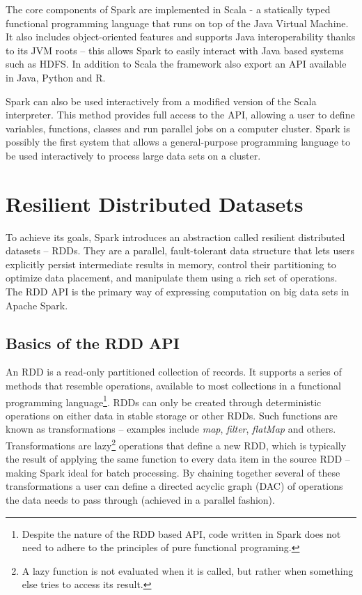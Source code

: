 \documentclass{l4proj}
\begin{document}
The core components of Spark are implemented in Scala - a statically typed functional programming language that runs on top of the Java Virtual Machine. It also includes object-oriented features and supports Java interoperability thanks to its JVM roots -- this allows Spark to easily interact with Java based systems such as HDFS. In addition to Scala the framework also export an API available in Java, Python and R.

Spark can also be used interactively from a modified version of the Scala interpreter. This method provides full access to the API, allowing a user to define variables, functions, classes and run parallel jobs on a computer cluster. Spark is possibly the first system that allows a general-purpose programming language to be used interactively to process large data sets on a cluster\cite{Spark}.

\section{Resilient Distributed Datasets}

To achieve its goals, Spark introduces an abstraction called resilient distributed datasets -- RDDs. They are a parallel, fault-tolerant data structure that lets users explicitly persist intermediate results in memory, control their partitioning to optimize data placement, and manipulate them using a rich set of operations\cite{RDD}. The RDD API is the primary way of expressing computation on big data sets in Apache Spark.

\subsection{Basics of the RDD API}

An RDD is a read-only partitioned collection of records. It supports a series of methods that resemble operations, available to most collections in a functional programming language\footnote{Despite the nature of the RDD based API, code written in Spark does not need to adhere to the principles of pure functional programing.}. RDDs can only be created through deterministic operations on either data in stable storage or other RDDs. Such functions are known as transformations -- examples include \textit{map}, \textit{filter}, \textit{flatMap} and others. Transformations are lazy\footnote{A lazy function is not evaluated when it is called, but rather when something else tries to access its result.} operations that define a new RDD, which is typically the result of applying the same function to every data item in the source RDD -- making Spark ideal for batch processing. By chaining together several of these transformations a user can define a directed acyclic graph (DAC) of operations the data needs to pass through (achieved in a parallel fashion).
\end{document}
